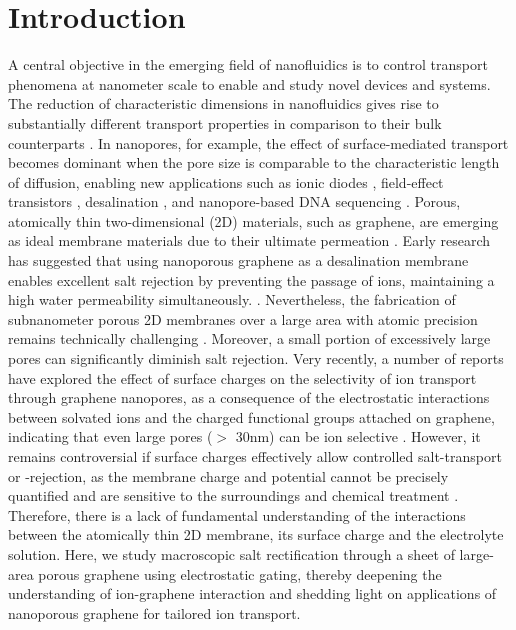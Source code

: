 \documentclass[journal=langd5,email=true, hyperref=true, keywords=false]{achemso}
\begin{document}
\clearpage{}
\linenumbers
\section{Introduction}
\label{sec:intro}
A central objective in the emerging field of nanofluidics is to
control transport phenomena at nanometer scale to enable and study
novel devices and systems. The reduction of characteristic dimensions
in nanofluidics gives rise to substantially different transport
properties in comparison to their bulk counterparts
\cite{Schoch_2008}. In nanopores, for example, the effect of
surface-mediated transport becomes dominant when the pore size is
comparable to the characteristic length of diffusion, enabling new
applications such as ionic diodes \cite{Karnik_2007}, field-effect
transistors \cite{Nam_2009}, desalination \cite{Heiranian_2015}, and
nanopore-based DNA sequencing \cite{Heerema_2016,Garaj_2013}. Porous,
atomically thin two-dimensional (2D) materials, such as graphene, are
emerging as ideal membrane materials due to their ultimate permeation
\cite{Suk_2010,Jiang_2009,Celebi_2014,Koenig_2012,Drahushuk_2012}. Early
research has suggested that using nanoporous graphene as a
desalination membrane enables excellent salt rejection by preventing
the passage of ions, maintaining a high water permeability
simultaneously.
\cite{Cohen_Tanugi_2012,Suk_2014,Cohen_Tanugi_2014,Cohen_Tanugi_2015,O_Hern_2014,O_Hern_2015,Surwade_2015,Walker_2017,Ghosh_2018}. Nevertheless,
the fabrication of subnanometer porous 2D membranes over a large area
with atomic precision remains technically challenging
\cite{Suk_2014,Rollings_2016,O_Hern_2012,Wang_2017}. Moreover, a small
portion of excessively large pores can significantly diminish salt
rejection.  Very recently, a number of reports have explored the
effect of surface charges on the selectivity of ion transport through
graphene nanopores, as a consequence of the electrostatic interactions
between solvated ions and the charged functional groups attached on
graphene, indicating that even large pores ($>$ 30nm) can be ion
selective \cite{Rollings_2016,Surwade_2014}. However, it remains
controversial if surface charges effectively allow controlled
salt-transport or -rejection, as the membrane charge and potential
cannot be precisely quantified and are sensitive to the surroundings
and chemical treatment \cite{Li_2008}. Therefore, there is a lack of
fundamental understanding of the interactions between the atomically
thin 2D membrane, its surface charge and the electrolyte
solution. Here, we study macroscopic salt rectification through a
sheet of large-area porous graphene using electrostatic gating,
thereby deepening the understanding of ion-graphene interaction and
shedding light on applications of nanoporous graphene for tailored ion
transport.
\end{document}
